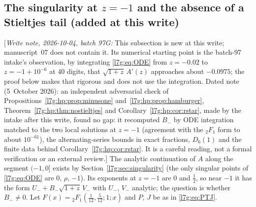 \documentclass[11pt,letterpaper]{article}
\theoremstyle{remark}\newtheorem{remark}[theorem]{Remark}
\newcommand{\hpnote}[1]{\textup{[}\emph{Write note, 2026-10-04, batch 97G:} #1\textup{]}}
\newcounter{l7gtrsavedeq}
\begin{document}
\subsection{The singularity at \texorpdfstring{$z=-1$}{z=-1} and the absence of a Stieltjes tail (added at this write)}\label{l7g:hp:sec:minusone}
\hpnote{This subsection is new at this write; manuscript~07 does not
contain it. Its numerical starting point is the batch-97 intake's
observation, by integrating \eqref{l7g:eq:ODE} from $z=-0.02$ to $z=-1+10^{-6}$
at 40 digits, that $\sqrt{1+z}\,A'(z)$ approaches about $-0.0975$; the
proof below makes that rigorous and does not use the integration.
Dated note (5~October 2026): an independent adversarial check of
Propositions~\ref{l7g:hp:prop:minusone} and~\ref{l7g:hp:prop:hamburger},
Theorem~\ref{l7g:hp:thm:nostieltjes} and
Corollary~\ref{l7g:hp:cor:rstar}, made by the intake after this write,
found no gap: it recomputed $B_-$ by ODE integration matched to the two
local solutions at $z=-1$ (agreement with the ${}_2F_1$ form to about
$10^{-61}$), the alternating-series bounds in exact fractions, $D_6(1)$
and the finite data behind Corollary~\ref{l7g:hp:cor:rstar}. It is a
careful reading, not a formal verification or an external review.} The
analytic continuation of $A$ along the segment $(-1,0]$ exists by
Section~\ref{l7g:sec:singularity} (the only singular points of
\eqref{l7g:eq:ODE} are $0$, $\rho$, $-1$). Its exponents at $z=-1$ are $0$
and $\frac12$, so near $-1$ it has the form $U_-+B_-\sqrt{1+z}\,V_-$ with
$U_-$, $V_-$ analytic; the question is whether $B_-\ne0$. Let
$F(x)={}_2F_1(\frac1{12},\frac5{12};1;x)$ and $P$, $J$ be as in
\eqref{l7g:eq:PTJ}.
\end{document}
